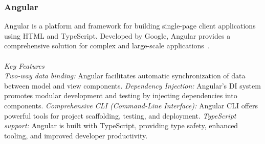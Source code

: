 \documentclass[conference]{IEEEtran}
\begin{document}





\subsubsection{Angular}

Angular is a platform and framework for building single-page client applications using HTML and TypeScript. Developed by Google, Angular provides a comprehensive solution for complex and large-scale applications~\cite{angular-io}.
\\\\
\textit{Key Features}\\
\textit{Two-way data binding:} Angular facilitates automatic synchronization of data between model and view components.
\newline\textit{Dependency Injection:} Angular's DI system promotes modular development and testing by injecting dependencies into components.
\newline\textit{Comprehensive CLI (Command-Line Interface):} Angular CLI offers powerful tools for project scaffolding, testing, and deployment.
\newline\textit{TypeScript support:} Angular is built with TypeScript, providing type safety, enhanced tooling, and improved developer productivity.
\newline
\end{document}
